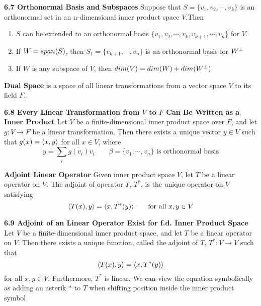 \documentclass[11pt]{article}
\begin{document}
\begin{theorem*}
    \textbf{6.7 Orthonormal Basis and Subspaces} Suppose that $S = \{v_1,v_2,\cdots, v_k\}$ is an orthonormal set in an n-dimensional inner product space $V$.Then 
    \begin{enumerate}
        \item $S$ can be extended to an orthonormal basis $\{v_1,v_2,\cdots, v_k, v_{k+1}, \cdots, v_n\}$ for $V$. 
        \item If $W = span(S)$, then $S_1 = \{v_{k+1}, \cdots, v_n\}$ is an orthonormal basis for $W^{\perp}$ 
        \item If $W$ is any subspace of $V$, then $dim(V) = dim(W) + dim(W^{\perp})$
    \end{enumerate}
\end{theorem*}


\begin{defn*}
    \textbf{Dual Space} is a space of all linear transformations from a vector space $V$ to its field $F$. 
\end{defn*}

\begin{theorem*}
    \textbf{6.8 Every Linear Transformation from $V$ to $F$ Can Be Written as a Inner Product} Let $V$ be a finite-dimensional inner product space over $F$, and let $g: V\to F$ be a linear transformation. Then there exists a unique vector $y\in V$ such that $g(x) = \langle x,y\rangle$ for all $x\in V$, where
    \[
        y = \sum_i \overline{g(v_i)} v_i \qquad \text{$\beta = \{v_1,\cdots, v_n\}$ is orthonormal basis}
    \]
\end{theorem*}


\begin{defn*}
    \textbf{Adjoint Linear Operator} Given inner product space $V$, let $T$ be a linear operator on $V$. The adjoint of operator $T$, $T^*$, is the unique operator on $V$ satisfying 
    \[
        \langle T(x),y\rangle = \langle x,T^*(y)\rangle    
        \qquad \text{for all $x,y\in V$}
    \]
\end{defn*}

\begin{theorem*}
    \textbf{6.9 Adjoint of an Linear Operator Exist for f.d. Inner Product Space} Let $V$ be a finite-dimensional inner product space, and let $T$ be a linear operator on $V$. Then there exists a unique function, called the adjoint of $T$, $T^*: V\to V$ such that
    \[
        \langle T(x),y\rangle = \langle x,T^*(y)\rangle    
    \]
    for all $x,y\in V$. Furthermore, $T^*$ is linear. We can view the equation symbolically as adding an asterik $*$ to $T$  when shifting position inside the inner product symbol
\end{theorem*}
\end{document}
